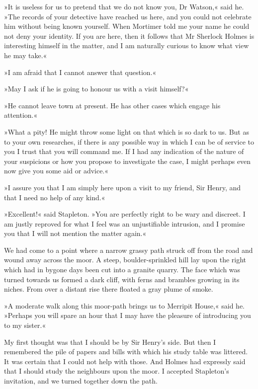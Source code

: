 »It is useless for us to pretend that we do not know you, Dr Watson,« said he. »The records of your detective have reached us here, and you could not celebrate him without being known yourself. When Mortimer told me your name he could not deny your identity. If you are here, then it follows that Mr Sherlock Holmes is interesting himself in the matter, and I am naturally curious to know what view he may take.«

»I am afraid that I cannot answer that question.«

»May I ask if he is going to honour us with a visit himself?«

»He cannot leave town at present. He has other cases which engage his attention.«

»What a pity! He might throw some light on that which is so dark to us. But as to your own researches, if there is any possible way in which I can be of service to you I trust that you will command me. If I had any indication of the nature of your suspicions or how you propose to investigate the case, I might perhaps even now give you some aid or advice.«

»I assure you that I am simply here upon a visit to my friend, Sir Henry, and that I need no help of any kind.«

»Excellent!« said Stapleton. »You are perfectly right to be wary and discreet. I am justly reproved for what I feel was an unjustifiable intrusion, and I promise you that I will not mention the matter again.«

We had come to a point where a narrow grassy path struck off from the road and wound away across the moor. A steep, boulder-sprinkled hill lay upon the right which had in bygone days been cut into a granite quarry. The face which was turned towards us formed a dark cliff, with ferns and brambles growing in its niches. From over a distant rise there floated a gray plume of smoke.

»A moderate walk along this moor-path brings us to Merripit House,« said he. »Perhaps you will spare an hour that I may have the pleasure of introducing you to my sister.«

My first thought was that I should be by Sir Henry's side. But then I remembered the pile of papers and bills with which his study table was littered. It was certain that I could not help with those. And Holmes had expressly said that I should study the neighbours upon the moor. I accepted Stapleton's invitation, and we turned together down the path.

